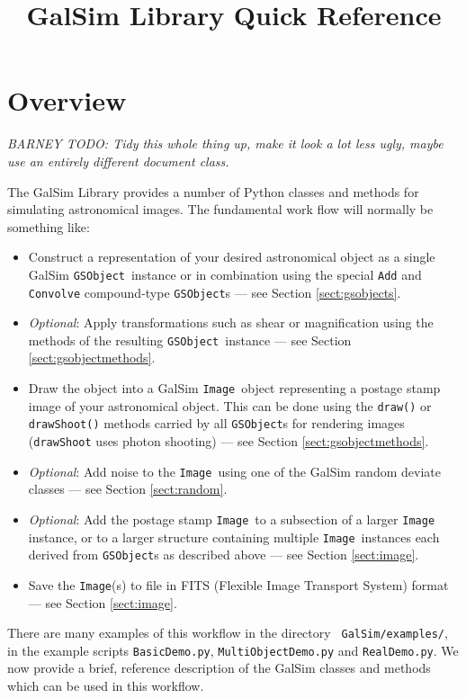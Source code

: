\documentclass[preprint,11pt]{aastex}
\newcommand{\gsobject}{{\tt GSObject}}
\newcommand{\image}{{\tt Image}}
\begin{document}
\setlength{\parskip}{2.0ex plus 0.5ex minus 0.5ex}
\setlength{\parindent}{0cm} 

\title{GalSim Library Quick Reference}

\section{Overview}

\emph{BARNEY TODO: Tidy this whole thing up, make it look a lot less ugly,
maybe use an entirely different document class.}

The GalSim Library provides a number of Python classes and methods for
simulating astronomical images.  The fundamental work flow will
normally be something like:
\begin{itemize}

\item Construct a representation of your desired astronomical object
  as a single GalSim \gsobject~instance or in combination using the special {\tt Add} and
  {\tt Convolve} compound-type \gsobject s --- see Section \ref{sect:gsobjects}.
\item \emph{Optional}: Apply transformations such as shear or magnification using
  the methods of the resulting \gsobject~instance --- see Section \ref{sect:gsobjectmethods}.
\item Draw the object into a GalSim \image~object representing a
  postage stamp image of your astronomical object.  This can be done
  using the {\tt draw()} or {\tt drawShoot()} methods carried by all
  \gsobject s for rendering images ({\tt drawShoot} uses photon
  shooting) --- see Section \ref{sect:gsobjectmethods}.
\item \emph{Optional}: Add noise to the \image~using one of the GalSim random
  deviate classes --- see Section \ref{sect:random}.
\item \emph{Optional}: Add the postage stamp \image~to a subsection of
  a larger \image~ instance, or to a larger
  structure containing multiple \image~instances each derived from \gsobject s
  as described above --- see Section \ref{sect:image}.
\item Save the \image (s) to file in FITS (Flexible Image Transport
  System) format --- see Section \ref{sect:image}.
\end{itemize}

There are many examples of this workflow in the directory {\tt
  GalSim/examples/}, in the example scripts {\tt BasicDemo.py},
{\tt MultiObjectDemo.py} and {\tt RealDemo.py}.  We now provide a
brief, reference description of the GalSim classes and methods which
can be used in this workflow.
\end{document}
